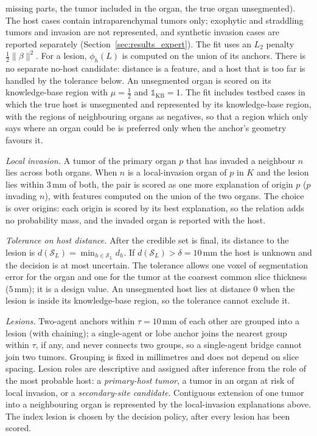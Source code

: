 \documentclass[fleqn,10pt]{olplainarticle}
\begin{document}
missing parts, the tumor included in the organ, the true organ unsegmented). The host cases contain
intraparenchymal tumors only; exophytic and straddling tumors and invasion are not represented, and synthetic invasion
cases are reported separately (Section~\ref{sec:results_expert}). The fit uses an $L_2$ penalty $\tfrac12\|\beta\|^2$. For a lesion, $\phi_h(L)$ is computed on the union of its anchors. There is no separate no-host candidate: distance is a feature, and a
host that is too far is handled by the tolerance below. An
unsegmented organ is scored on its knowledge-base region with $\mu=\tfrac12$ and $\mathbb{1}_{\mathrm{KB}}=1$. The fit
includes testbed cases in which the true host is unsegmented and represented by its knowledge-base region, with the
regions of neighbouring organs as negatives, so that a region which only says where an organ could be is preferred only
when the anchor's geometry favours it.

\emph{Local invasion.} A tumor of the primary organ $p$ that has invaded a neighbour $n$ lies across both organs. When
$n$ is a local-invasion organ of $p$ in $K$ and the lesion lies within $3$\,mm of both, the pair is scored as one more
explanation of origin $p$ ($p$ invading $n$), with features computed on the union of the two organs. The choice is over
origins: each origin is scored by its best explanation, so the relation adds no probability mass, and the invaded organ is
reported with the host.

\emph{Tolerance on host distance.} After the credible set is final, its distance to the lesion is
$d(\mathcal{S}_L)=\min_{h\in\mathcal{S}_L}d_h$. If $d(\mathcal{S}_L)>\delta=10$\,mm the host is unknown and the decision is
at most uncertain. The tolerance allows one voxel of segmentation error for the organ and one for the tumor at the
coarsest common slice thickness ($5$\,mm); it is a design value. An unsegmented host lies at distance $0$ when the lesion
is inside its knowledge-base region, so the tolerance cannot exclude it.

\emph{Lesions.} Two-agent anchors within $\tau=10$\,mm of each other are grouped into a lesion (with chaining); a single-agent
or lobe anchor joins the nearest group within $\tau$, if any, and never connects two groups, so a single-agent bridge cannot join
two tumors. Grouping is fixed in millimetres and does not depend on slice
spacing. Lesion roles are descriptive and assigned after inference from the role of the most probable host: a
\emph{primary-host tumor}, a tumor in an organ at risk of local invasion, or a \emph{secondary-site candidate}.
Contiguous extension of one tumor into a neighbouring organ is represented by the local-invasion explanations above. The index lesion is chosen by the
decision policy, after every lesion has been scored.
\end{document}

